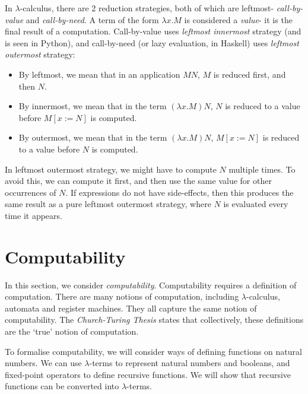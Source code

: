 \documentclass[a4paper, openany]{memoir}
\theoremstyle{definition}
\begin{document}
    In $\lambda$-calculus, there are 2 reduction strategies, both of which are leftmost- \emph{call-by-value} and \emph{call-by-need}. A term of the form $\lambda x.M$ is considered a \emph{value}- it is the final result of a computation. Call-by-value uses \emph{leftmost innermost} strategy (and is seen in Python), and call-by-need (or lazy evaluation, in Haskell) uses \emph{leftmost outermost} strategy:
    \begin{itemize}
        \item By leftmost, we mean that in an application $MN$, $M$ is reduced first, and then $N$.
        \item By innermost, we mean that in the term $(\lambda x.M) N$, $N$ is reduced to a value before $M[x := N]$ is computed.
        \item By outermost, we mean that in the term $(\lambda x.M) N$, $M[x := N]$ is reduced to a value before $N$ is computed. 
    \end{itemize}
    In leftmost outermost strategy, we might have to compute $N$ multiple times. To avoid this, we can compute it first, and then use the same value for other occurrences of $N$. If expressions do not have side-effects, then this produces the same result as a pure leftmost outermost strategy, where $N$ is evaluated every time it appears.
    \newpage

    \section{Computability}
    In this section, we consider \emph{computability}. Computability requires a definition of computation. There are many notions of computation, including $\lambda$-calculus, automata and register machines. They all capture the same notion of computability. The \emph{Church-Turing Thesis} states that collectively, these definitions are the `true' notion of computation.

    To formalise computability, we will consider ways of defining functions on natural numbers. We can use $\lambda$-terms to represent natural numbers and booleans, and fixed-point operators to define recursive functions. We will show that recursive functions can be converted into $\lambda$-terms.
\end{document}
